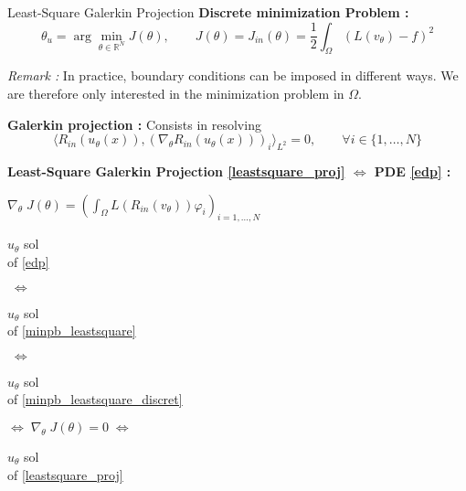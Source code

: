 \begin{frame}{Least-Square Galerkin Projection}
	\textbf{Discrete minimization Problem :}
	\begin{equation}
		\theta_u=\arg\min_{\theta\in\mathbb{R}^N} J(\theta), \qquad J(\theta)=J_{in}(\theta)=\frac{1}{2}\int_\Omega (L(v_\theta) - f)^2 \label{minpb_leastsquare_discret}
	\end{equation}
	
	\footnotesize	
	\textit{Remark :} In practice, boundary conditions can be imposed in different ways. We are therefore only interested in the minimization problem in $\Omega$.
	
	\normalsize	
	
	\textbf{Galerkin projection :} Consists in resolving
	\begin{equation}
		\langle R_{in}(u_\theta(x)),(\nabla_\theta R_{in}(u_\theta(x)))_i\rangle_{L^2}=0, \qquad \forall i\in\{1,\dots,N\}\label{leastsquare_proj}
	\end{equation}
	
	\footnotesize
	\begin{center}
		\begin{tcolorbox}[
			colback=white, %
			colframe=other, %
			arc=2mm, %
			boxrule=0.5pt, %
			breakable, enhanced jigsaw,
			width=\linewidth
			]
			
			\textbf{Least-Square Galerkin Projection \eqref{leastsquare_proj} $\Leftrightarrow$ PDE \eqref{edp} :}
			
			\centering
			$\nabla_\theta \; J(\theta)=\left(\int_\Omega L(R_{in}(v_\theta))\varphi_i\right)_{i=1,\dots,N} \qquad $  
			
			\vspace{5pt}
			
			\begin{minipage}{0.1\linewidth}
				\centering
				$u_\theta$ sol \\
				of \eqref{edp}
			\end{minipage} $\; \Leftrightarrow \;$	\begin{minipage}{0.1\linewidth}
				\centering
				$u_\theta$ sol \\
				of \eqref{minpb_leastsquare}
			\end{minipage} $\; \Leftrightarrow \;$	\begin{minipage}{0.1\linewidth}
				\centering
				$u_\theta$ sol \\
				of \eqref{minpb_leastsquare_discret}
			\end{minipage} $\Leftrightarrow \; \nabla_\theta \; J(\theta)=0 \; \Leftrightarrow$ \begin{minipage}{0.1\linewidth}
				\centering
				$u_\theta$ sol \\
				of \eqref{leastsquare_proj}
			\end{minipage}
			

\end{tcolorbox}
\end{center}
\end{frame}
